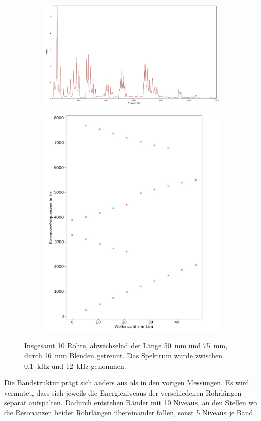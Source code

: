 \begin{figure}
\centering
\begin{subfigure}{0.65\textwidth}
\includegraphics[width=\textwidth]{content/messungen/Chapter4b/4b_6.jpg}
\end{subfigure}
\begin{subfigure}{0.34\textwidth}
\includegraphics[width=\textwidth]{content/Scripts/4b_6.jpg}
\end{subfigure}
\caption{Insgesamt 10 Rohre, abwechselnd der Länge 50~mm und 75~mm, durch 16~mm Blenden getrennt. Das Spektrum wurde zwischen 0.1~kHz und 12~kHz genommen.}
\label{fig:4b_6}
\end{figure}
Die Bandstruktur prägt sich anders aus als in den vorigen Messungen.  
Es wird vermutet, dass sich jeweils die Energieniveaus der verschiedenen Rohrlängen separat aufspalten.
Dadurch entstehen Bänder mit 10 Niveaus, an den Stellen wo die Resonanzen beider Rohrlängen übereinander fallen, sonst 5 Niveaus je Band.
\FloatBarrier
